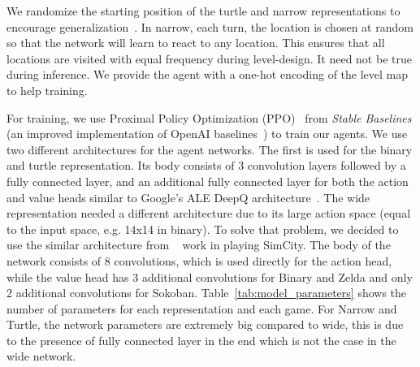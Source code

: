 \documentclass[letterpaper]{article} %
\begin{document}
We randomize the starting position of the turtle and narrow representations to encourage generalization~\cite{justesen2018illuminating}. In narrow, each turn, the location is chosen at random so that the network will learn to react to any location. This ensures that all locations are visited with equal frequency during level-design. It need not be true during inference. We provide the agent with a one-hot encoding of the level map to help training.

\begin{table}
    \centering
    \caption{The sizes of the trained models in terms of thousands of parameters ($10^{3}$).}
    \label{tab:model_parameters}
\end{table}

For training, we use Proximal Policy Optimization (PPO)~\cite{schulman2017proximal} from \emph{Stable Baselines} (an improved implementation of OpenAI baselines~\cite{dhariwal2017openai}) to train our agents. We use two different architectures for the agent networks. The first is used for the binary and turtle representation. Its body consists of 3 convolution layers followed by a fully connected layer, and an additional fully connected layer for both the action and value heads similar to Google's ALE DeepQ architecture~\cite{mnih2015human}. The wide representation needed a different architecture due to its large action space (equal to the input space, e.g. 14x14 in binary). To solve that problem, we decided to use the similar architecture from \citeauthor{earle2019using}~ work in playing SimCity. The body of the network consists of 8 convolutions, which is used directly for the action head, while the value head has 3 additional convolutions for Binary and Zelda and only 2 additional convolutions for Sokoban. Table~\ref{tab:model_parameters} shows the number of parameters for each representation and each game. For Narrow and Turtle, the network parameters are extremely big compared to wide, this is due to the presence of fully connected layer in the end which is not the case in the wide network. %
\end{document}
